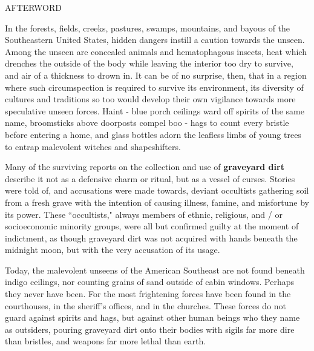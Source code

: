 \documentclass[12pt]{article}
\begin{document}
\vspace*{3\baselineskip}

\begin{center}
\huge AFTERWORD
\end{center}

\vspace*{2\baselineskip}

\begingroup
\hspace{10mm} In the forests, fields, creeks, pastures, swamps, mountains, and bayous of the Southeastern United States, hidden dangers instill a caution towards the unseen. Among the unseen are concealed animals and hematophagous insects, heat which drenches the outside of the body while leaving the interior too dry to survive, and air of a thickness to drown in. It can be of no surprise, then, that in a region where such circumspection is required to survive its environment, its diversity of cultures and traditions so too would develop their own vigilance towards more speculative unseen forces. Haint - blue porch ceilings ward off spirits of the same name, broomsticks above doorposts compel boo - hags to count every bristle before entering a home, and glass bottles adorn the leafless limbs of young trees to entrap malevolent witches and shapeshifters. 
\endgroup

\begingroup
\hspace{10mm} Many of the surviving reports on the collection and use of \textbf{graveyard dirt} describe it not as a defensive charm or ritual, but as a vessel of curses. Stories were told of, and accusations were made towards, deviant occultists gathering soil from a fresh grave with the intention of causing illness, famine, and misfortune by its power. These ``occultists," always members of ethnic, religious, and / or socioeconomic minority groups, were all but confirmed guilty at the moment of indictment, as though graveyard dirt was not acquired with hands beneath the midnight moon, but with the very accusation of its usage.
\endgroup

\begingroup
\hspace{10mm} Today, the malevolent unseens of the American Southeast are not found beneath indigo ceilings, nor counting grains of sand outside of cabin windows. Perhaps they never have been. For the most frightening forces have been found in the courthouses, in the sheriff's offices, and in the churches. These forces do not guard against spirits and hags, but against other human beings who they name as outsiders, pouring graveyard dirt onto their bodies with sigils far more dire than bristles, and weapons far more lethal than earth. 
\endgroup
\end{document}
